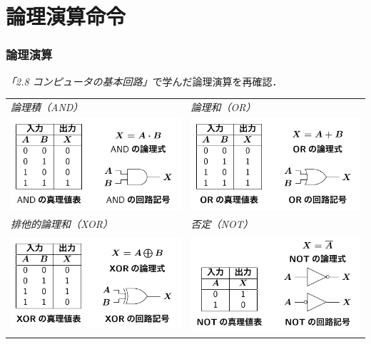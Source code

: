 \documentclass{beamer}                 %
\begin{document}
\section{論理演算命令}
\begin{frame}
  \frametitle{論理演算}
  \emph{「2.8 コンピュータの基本回路」}で学んだ論理演算を再確認．
  \vfill
  \begin{tabular}{l l}
    \emph{論理積（AND）} & \emph{論理和（OR）}      \\
    \includegraphics[scale=0.7]{../Tikz/and.pdf}    &
    \includegraphics[scale=0.7]{../Tikz/or.pdf}     \\
    \emph{排他的論理和（XOR）} & \emph{否定（NOT）} \\
    \includegraphics[scale=0.7]{../Tikz/xor.pdf}    &
    \includegraphics[scale=0.7]{../Tikz/not.pdf}    \\

\end{tabular}
\end{frame}
\end{document}
